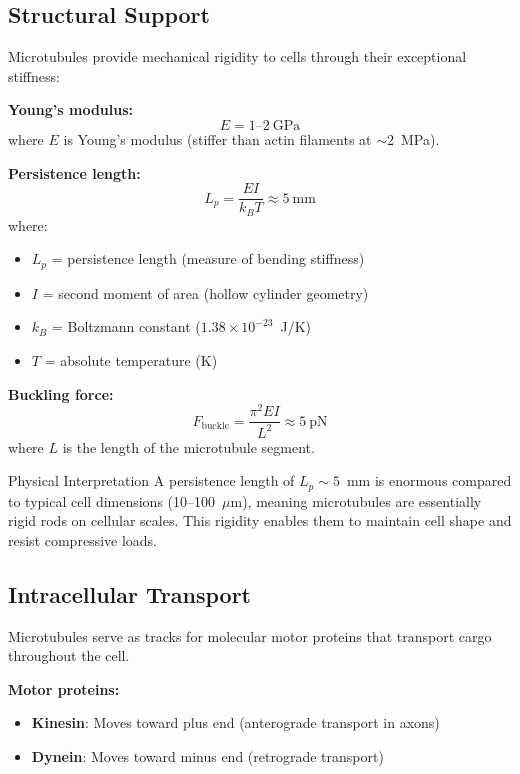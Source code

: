 \subsection{Structural Support}

Microtubules provide mechanical rigidity to cells through their exceptional stiffness:

\textbf{Young's modulus:}
\begin{equation}
E = 1\text{--}2\ \mathrm{GPa}
\end{equation}
where $E$ is Young's modulus (stiffer than actin filaments at $\sim$2~MPa).

\textbf{Persistence length:}
\begin{equation}
L_p = \frac{EI}{k_B T} \approx 5\ \mathrm{mm}
\end{equation}
where:
\begin{itemize}
\item $L_p$ = persistence length (measure of bending stiffness)
\item $I$ = second moment of area (hollow cylinder geometry)
\item $k_B$ = Boltzmann constant ($1.38 \times 10^{-23}$~J/K)
\item $T$ = absolute temperature (K)
\end{itemize}

\textbf{Buckling force:}
\begin{equation}
F_{\mathrm{buckle}} = \frac{\pi^2 EI}{L^2} \approx 5\ \mathrm{pN}
\end{equation}
where $L$ is the length of the microtubule segment.

\begin{calloutbox}{Physical Interpretation}
A persistence length of $L_p \sim 5$~mm is enormous compared to typical cell dimensions (10--100~$\mu$m), meaning microtubules are essentially rigid rods on cellular scales. This rigidity enables them to maintain cell shape and resist compressive loads.
\end{calloutbox}

\subsection{Intracellular Transport}

Microtubules serve as tracks for molecular motor proteins that transport cargo throughout the cell.

\textbf{Motor proteins:}
\begin{itemize}
\item \textbf{Kinesin}: Moves toward plus end (anterograde transport in axons)
\item \textbf{Dynein}: Moves toward minus end (retrograde transport)
\end{itemize}

